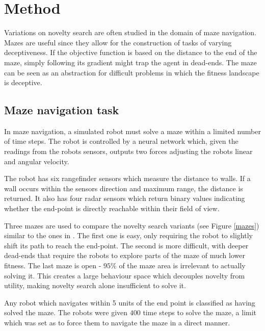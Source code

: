 \section{Method}
Variations on novelty search are often studied in the domain of maze navigation. Mazes are useful
since they allow for the construction of tasks of varying deceptiveness. If the objective function is
based on the distance to the end of the maze, simply following its gradient might trap the agent in
dead-ends. The maze can be seen as an abstraction for difficult problems in which the fitness
landscape is deceptive.

\subsection{Maze navigation task}
In maze navigation, a simulated robot must solve a maze within a limited number of time steps.
The robot is controlled by a neural network which, given the readings from the robots sensors,
outputs two forces adjusting the robots linear and angular velocity.

The robot has six rangefinder sensors which measure the distance to walls. If a wall occurs within the sensors
direction and maximum range, the distance is returned. It also has four radar sensors which return binary
values indicating whether the end-point is directly reachable within their field of view.

Three mazes are used to compare the novelty search variants (see Figure \ref{mazes}) similar to the ones in \cite{ns_study, novelty_alone}.
The first one is easy, only requiring the robot to slightly shift its path to reach the end-point. The second is more
difficult, with deeper dead-ends that require the robots to explore parts of the maze of much lower fitness.
The last maze is open - $95 \%$ of the maze area is irrelevant to actually solving it. This creates a
large behaviour space which decouples novelty from utility, making novelty search alone insufficient
to solve it.

Any robot which navigates within 5 units of the end point is classified as having solved the maze. The robots
were given $400$ time steps to solve the maze, a limit which was set as to force them to navigate the maze
in a direct manner.


